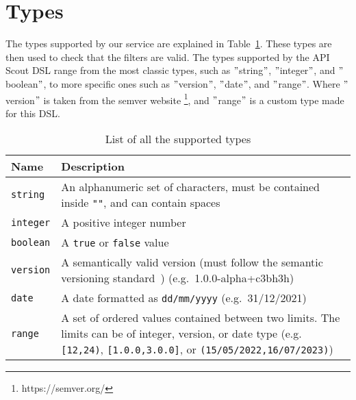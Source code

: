\section{Types}\label{sec:types}
The types supported by our service are explained in Table~\ref{tab:types}.
These types are then used to check that the filters are valid.
The types supported by the API Scout DSL range from the most classic types, such as \("\)string\("\), \("\)integer\("\), and \("\)boolean\("\), to more specific ones such as \("\)version\("\), \("\)date\("\), and \("\)range\("\).
Where \("\)version\("\) is taken from the semver website \footnote{https://semver.org/}, and \("\)range\("\) is a custom type made for this DSL\@.

\begin{table}[!h]
    \begin{center}
        \begin{tabular}{l p{15cm}}
            \hline
            \textbf{Name} & \textbf{Description} \\ \hline
            \verb|string| & An alphanumeric set of characters, must be contained inside \verb|""|, and can contain spaces \\
            \verb|integer| & A positive integer number \\
            \verb|boolean| & A \verb|true| or \verb|false| value \\
            \verb|version| & A semantically valid version (must follow the semantic versioning standard~\cite{preston-werner_semantic_nodate}) (e.g.\ 1.0.0-alpha+c3bh3h) \\
            \verb|date| & A date formatted as \verb|dd/mm/yyyy| (e.g.\ 31/12/2021) \\
            \verb|range| & A set of ordered values contained between two limits.
            The limits can be of integer, version, or date type (e.g. \verb|[12,24)|, \verb|[1.0.0,3.0.0]|, or \verb|(15/05/2022,16/07/2023)|) \\ \hline
        \end{tabular}
    \end{center}

    \caption{List of all the supported types}
    \label{tab:types}
\end{table}